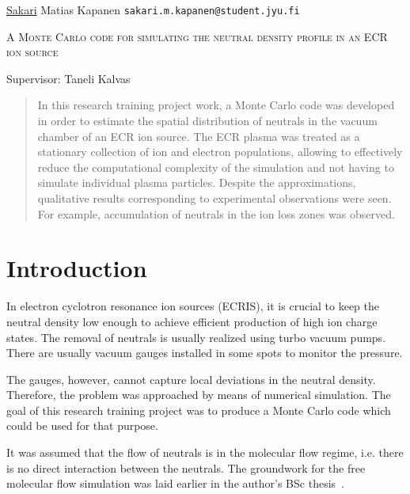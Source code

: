 \documentclass[a4paper,twoside,12pt]{article}
\begin{document}
\thispagestyle{empty}
\begin{flushleft}
 \underline{Sakari} Matias Kapanen\hfill
 \texttt{sakari.m.kapanen@student.jyu.fi}
\end{flushleft}
\vfill
\begin{center}
\textsc{\LARGE A Monte Carlo code for simulating the neutral density profile in an ECR ion source}
\end{center}
\vfill
Supervisor: Taneli Kalvas\\
\vfill
\begin{abstract}
 \noindent
    In this research training project work, a Monte Carlo code was developed in
    order to estimate the spatial distribution of neutrals in the vacuum
    chamber of an ECR ion source. The ECR plasma was treated as a stationary
    collection of ion and electron populations, allowing to effectively reduce
    the computational complexity of the simulation and not having to simulate
    individual plasma particles. Despite the approximations, qualitative
    results corresponding to experimental observations were seen. For example,
    accumulation of neutrals in the ion loss zones was observed.
\end{abstract}
\clearpage%

\setlength{\parindent}{0pt}
\setlength{\parskip}{12pt}

\setcounter{page}{1}

\section{Introduction}

In electron cyclotron resonance ion sources (ECRIS), it is crucial to keep the neutral density low enough to achieve efficient production of high ion charge states. The removal of neutrals is usually realized using turbo vacuum pumps. There are usually vacuum gauges installed in some spots to monitor the pressure.

The gauges, however, cannot capture local deviations in the neutral density. Therefore, the problem was approached by means of numerical simulation. The goal of this research training project was to produce a Monte Carlo code which could be used for that purpose.

It was assumed that the flow of neutrals is in the molecular flow regime, i.e. there is no direct interaction between the neutrals. The groundwork for the free molecular flow simulation was laid earlier in the author's BSc thesis~\cite{kapanen:bsc}.
\end{document}
